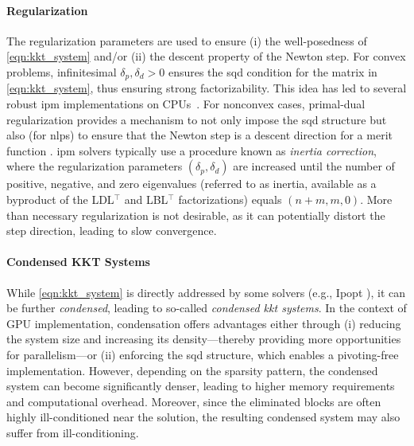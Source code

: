 \documentclass{article}
\begin{document}
\paragraph{Regularization}
The regularization parameters are used to ensure (i) the well-posedness of \cref{eqn:kkt_system} and/or (ii) the descent property of the Newton step. For convex problems, infinitesimal $\delta_p, \delta_d > 0$ ensures the \gls*{sqd} condition for the matrix in \eqref{eqn:kkt_system}, thus ensuring strong factorizability. This idea has led to several robust \gls{ipm} implementations on CPUs~\cite{friedlanderPrimalDualRegularized2012}. For nonconvex cases, primal-dual regularization provides a mechanism to not only impose the \gls*{sqd} structure but also (for \glspl*{nlp}) to ensure that the Newton step is a descent direction for a merit function \cite{wachterImplementationInteriorpointFilter2006}. \Gls{ipm} solvers typically use a procedure known as \emph{inertia correction}, where the regularization parameters $(\delta_p, \delta_d)$ are increased until the number of positive, negative, and zero eigenvalues (referred to as inertia, available as a byproduct of the LDL$^\top$ and LBL$^\top$ factorizations) equals $(n+m, m, 0)$. More than necessary regularization is not desirable, as it can potentially distort the step direction, leading to slow convergence.


\paragraph{Condensed KKT Systems}
While \cref{eqn:kkt_system} is directly addressed by some solvers (e.g., Ipopt \cite{wachterImplementationInteriorpointFilter2006}), it can be further \emph{condensed}, leading to so-called \emph{condensed \gls*{kkt} systems}.
In the context of GPU implementation, condensation offers advantages either through (i) reducing the system size and increasing its density—thereby providing more opportunities for parallelism—or (ii) enforcing the \gls*{sqd} structure, which enables a pivoting-free implementation.
However, depending on the sparsity pattern, the condensed system can become significantly denser, leading to higher memory requirements and computational overhead.
Moreover, since the eliminated blocks are often highly ill-conditioned near the solution, the resulting condensed system may also suffer from ill-conditioning.
\end{document}
